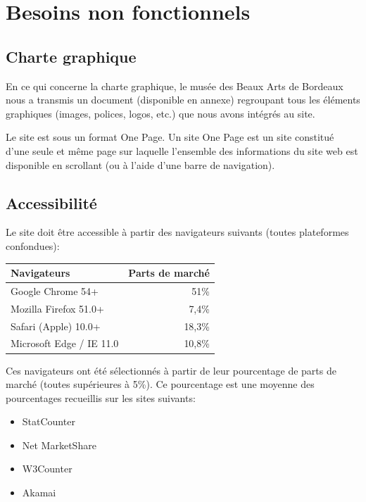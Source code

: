 \documentclass[11pt]{report}
\begin{document}
\section{Besoins non fonctionnels}

\subsection*{Charte graphique}

En ce qui concerne la charte graphique, le musée des Beaux Arts de Bordeaux nous a transmis un document (disponible en annexe) regroupant tous les éléments graphiques (images, polices, logos, etc.) que nous avons intégrés au site.

Le site est sous un format One Page. Un site One Page est un site constitué
d'une seule et même page sur laquelle l'ensemble des informations du site web
est disponible en scrollant (ou à l'aide d'une barre de navigation).

\subsection*{Accessibilité}

Le site doit être accessible à partir des navigateurs suivants (toutes plateformes confondues):
\begin{center}
	\begin{tabular}{|l | r|}
		\hline
		Navigateurs & Parts de marché \\
		\hline
		\hline
		Google Chrome 54+ & 51\%  \\
		\hline
		Mozilla Firefox 51.0+ & 7,4\% \\
		\hline
		Safari (Apple) 10.0+ & 18,3\% \\
		\hline
		Microsoft Edge / IE 11.0 & 10,8\% \\
		\hline
	\end{tabular}
\end{center}
Ces navigateurs ont été sélectionnés à partir de leur pourcentage de parts de marché (toutes supérieures à 5\%). Ce pourcentage est une moyenne des pourcentages recueillis sur les sites suivants:
\begin{itemize}
	\item StatCounter
	\item Net MarketShare
	\item W3Counter
	\item Akamai
\end{itemize}
\end{document}
